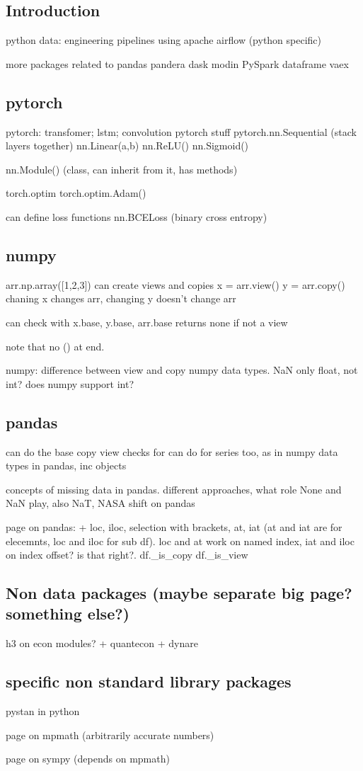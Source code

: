 
\subsection{Introduction}

python data: engineering pipelines using apache airflow (python specific)





more packages related to pandas
pandera
dask
modin
PySpark dataframe
vaex

\subsection{pytorch}
pytorch: transfomer; lstm; convolution
pytorch stuff
pytorch.nn.Sequential (stack layers together)
nn.Linear(a,b)
nn.ReLU()
nn.Sigmoid()

nn.Module() (class, can inherit from it, has methods)

torch.optim
torch.optim.Adam()

can define loss functions
nn.BCELoss (binary cross entropy)
\subsection{numpy}
arr.np.array([1,2,3])
can create views and copies
x = arr.view()
y = arr.copy()
chaning x changes arr, changing y doesn't change arr

can check with x.base, y.base, arr.base
returns none if not a view

note that no () at end.

numpy: difference between view and copy
numpy data types. NaN only float, not int? does numpy support int?
\subsection{pandas}
 can do the base copy view checks for can do for series too, as in numpy
data types in pandas, inc objects

concepts of missing data in pandas. different approaches, what role None and NaN play, also NaT, NASA
shift on pandas

page on pandas:
+ loc, iloc, selection with brackets, at, iat (at and iat are for elecemnts, loc and iloc for sub df). loc and at work on named index, iat and iloc on index offset? is that right?.
df.\_is\_copy
df.\_is\_view
\subsection{Non data packages (maybe separate big page? something else?)}
h3 on econ modules?
+ quantecon
+ dynare
\subsection{specific non standard library packages}

pystan in python

page on mpmath (arbitrarily accurate numbers)

page on sympy (depends on mpmath)


